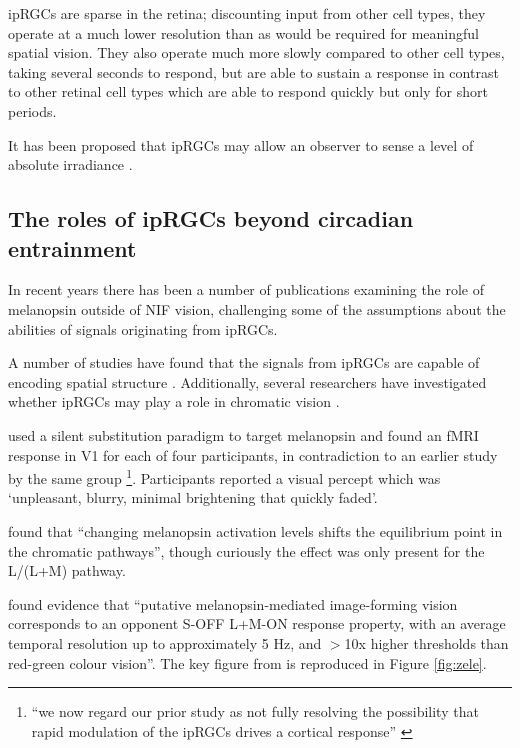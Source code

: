 \Glspl{ipRGC} are sparse in the retina; discounting input from other cell types, they operate at a much lower resolution than as would be required for meaningful spatial vision. They also operate much more slowly compared to other cell types, taking several seconds to respond, but are able to sustain a response in contrast to other retinal cell types which are able to respond quickly but only for short periods.

It has been proposed that \glspl{ipRGC} may allow an observer to sense a level of absolute irradiance \citep{brown_melanopsin_2010}. 

\subsection{The roles of ipRGCs beyond circadian entrainment}
\label{sec:ipRGCbeyond}

In recent years there has been a number of publications examining the role of melanopsin outside of \gls{NIF} vision, challenging some of the assumptions about the abilities of signals originating from \glspl{ipRGC}.

A number of studies have found that the signals from ipRGCs are capable of encoding spatial structure \citep{ecker_melanopsin-expressing_2010, mouland_responses_2017, allen_melanopsin_2017, allen_form_2019, zhao_photoresponse_2014}. %
%
Additionally, several researchers have investigated whether \glspl{ipRGC} may play a role in chromatic vision \citep{cao_evidence_2018, spitschan_human_2017-1,zele_melanopsin_2018}.

\citet{spitschan_human_2017-1} used a silent substitution paradigm to target melanopsin and found an fMRI response in V1 for each of four participants, in contradiction to an earlier study by the same group \citep{spitschan_human_2016}\footnote{``we now regard our prior study as not fully resolving the possibility that rapid modulation of the ipRGCs drives a cortical response'' \citep{spitschan_human_2017-1}}. Participants reported a visual percept which was `unpleasant, blurry, minimal brightening that quickly faded'.

\citet{cao_evidence_2018} found that ``changing melanopsin activation levels shifts the equilibrium point in the chromatic pathways'', though curiously the effect was only present for the L/(L+M) pathway.

\citet{zele_melanopsin_2018} found evidence that ``putative melanopsin-mediated image-forming vision corresponds to an opponent S-OFF L+M-ON response property, with an average temporal resolution up to approximately 5 Hz, and $>$10x higher thresholds than red-green colour vision''. The key figure from \citet{zele_melanopsin_2018} is reproduced in Figure \ref{fig:zele}.

